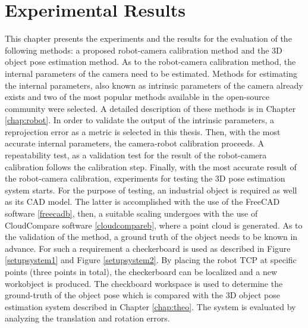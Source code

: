 
\chapter{Experimental Results}
\label{chap:exp}

This chapter presents the experiments and the results for the evaluation of the following methods: a proposed robot-camera calibration method and the 3D object pose estimation method. As to the robot-camera calibration method, the internal parameters of the camera need to be estimated. Methods for estimating the internal parameters, also known as intrinsic parameters of the camera already exists and two of the most popular methods available in the open-source community were selected. A detailed description of these methods is in Chapter \ref{chap:robot}. In order to validate the output of the intrinsic parameters, a reprojection error as a metric is selected in this thesis. Then, with the most accurate internal parameters, the camera-robot calibration proceeds. A repeatability test, as a validation test for the result of the robot-camera calibration follows the calibration step. Finally, with the most accurate result of the robot-camera calibration, experiments for testing the 3D pose estimation system starts. For the purpose of testing, an industrial object is required as well as its CAD model. The latter is accomplished with the use of the FreeCAD software \ref{freecadb}, then, a suitable scaling undergoes with the use of CloudCompare software \ref{cloudcompareb}, where a point cloud is generated. As to the validation of the method, a ground truth of the object needs to be known in advance. For such a requirement a checkerboard is used as described in Figure \ref{setupsystem1} and Figure \ref{setupsystem2}. By placing the robot TCP at specific points (three points in total), the checkerboard can be localized and a new workobject is produced. The checkboard workspace is used to determine the ground-truth of the object pose which is compared with the 3D object pose estimation system described in Chapter \ref{chap:theo}. The system is evaluated by analyzing the translation and rotation errors. 


